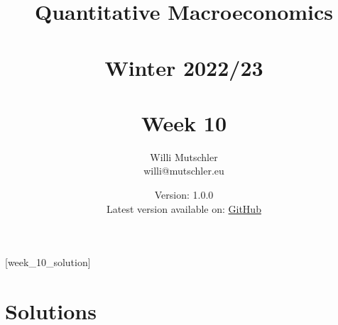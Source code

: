 
\newif\ifDisplaySolutions\DisplaySolutionstrue


\title{Quantitative Macroeconomics\\~\\Winter 2022/23\\~\\Week 10}
\author{Willi Mutschler\\willi@mutschler.eu}
\date{Version: 1.0.0\\Latest version available on: \href{https://github.com/wmutschl/Quantitative-Macroeconomics/releases/latest/download/week_10.pdf}{GitHub}}
\maketitle\thispagestyle{empty}

\newpage
{}[week_10_solution]
\tableofcontents\thispagestyle{empty}\newpage

\setcounter{page}{1}
\newpage
\newpage

\printbibliography
\newpage

\ifDisplaySolutions
\newpage
\appendix
\section{Solutions}

\fi
